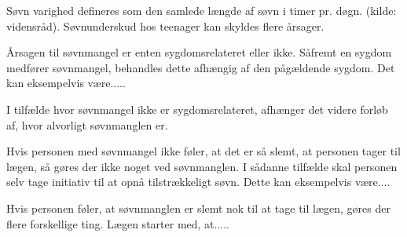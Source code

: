 Søvn varighed defineres som den samlede længde af søvn i timer pr. døgn. (kilde: vidensråd). 
Søvnunderskud hos teenager kan skyldes flere årsager. 



Årsagen til søvnmangel er enten sygdomsrelateret eller ikke. Såfremt en sygdom medfører søvnmangel, behandles dette afhængig af den pågældende sygdom. Det kan eksempelvis være.....

I tilfælde hvor søvnmangel ikke er sygdomsrelateret, afhænger det videre forløb af, hvor alvorligt søvnmanglen er. 

Hvis personen med søvnmangel ikke føler, at det er så slemt, at personen tager til lægen, så gøres der ikke noget ved søvnmanglen. I sådanne tilfælde skal personen selv tage initiativ til at opnå tilstrækkeligt søvn. Dette kan eksempelvis være....

Hvis personen føler, at søvnmanglen er slemt nok til at tage til lægen, gøres der flere forskellige ting. Lægen starter med, at.....